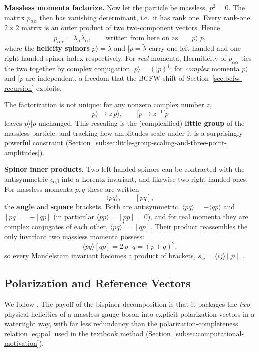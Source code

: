 \textbf{Massless momenta factorize.} Now let the particle be massless, $p^2 = 0$. The matrix $p_{\alpha \dot\alpha}$ then has vanishing determinant, i.e.\ it has rank one. Every rank-one $2 \times 2$ matrix is an outer product of two two-component vectors. Hence
\[
	p_{\alpha \dot\alpha} = \lambda_\alpha \tilde\lambda_{\dot\alpha},
	\qquad \text{written from here on as} \qquad
	p \rangle [ p
,\]
where the \textbf{helicity spinors} $p\rangle = \lambda$ and $[p = \tilde\lambda$ carry one left-handed and one right-handed spinor index respectively. For \emph{real} momenta, Hermiticity of $p_{\alpha\dot\alpha}$ ties the two together by complex conjugation, $p \rangle = \left( [ p \right)^\dag$; for \emph{complex} momenta $p\rangle$ and $[p$ are independent, a freedom that the BCFW shift of Section~\ref{sec:bcfw-recursion} exploits.

The factorization is not unique: for any nonzero complex number $z$,
\[
	p \rangle \to z\, p \rangle,
	\qquad
	[ p \to z^{-1} [ p
\]
leaves $p\rangle[p$ unchanged. This rescaling is the (complexified) \textbf{little group} of the massless particle, and tracking how amplitudes scale under it is a surprisingly powerful constraint (Section~\ref{subsec:little-group-scaling-and-three-point-amplitudes}).

\textbf{Spinor inner products.} Two left-handed spinors can be contracted with the antisymmetric $\epsilon_{\alpha\beta}$ into a Lorentz invariant, and likewise two right-handed ones. For massless momenta $p, q$ these are written
\[
	\langle p q \rangle, \qquad [ p q ],
\]
the \textbf{angle} and \textbf{square} brackets. Both are antisymmetric, $\langle pq \rangle = -\langle qp \rangle$ and $[pq] = -[qp]$ (in particular $\langle pp \rangle = [pp] = 0$), and for real momenta they are complex conjugates of each other, $\langle pq \rangle^* = [qp]$. Their product reassembles the only invariant two massless momenta possess:
\[
	\langle p q \rangle [ q p ] = 2\, p \cdot q = (p + q)^2
,\]
so every Mandelstam invariant becomes a product of brackets, $s_{ij} = \langle ij \rangle [ji]$ \autocite[\S27.1]{schwartzQFT2014}.

\subsection{Polarization and Reference Vectors}
\label{subsec:polarization-and-reference-vectors}

We follow \autocite[\S27.1.2]{schwartzQFT2014}. The payoff of the bispinor decomposition is that it packages the \emph{two} physical helicities of a massless gauge boson into explicit polarization vectors in a watertight way, with far less redundancy than the polarization-completeness relation \eqref{eq:pol} used in the textbook method (Section~\ref{subsec:computational-motivation}).

